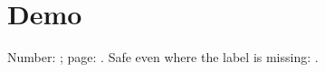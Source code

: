 \documentclass{article}
\begin{document}
\section{Demo}\label{demo}
Number: ; page: .
Safe even where the label is missing: .
\end{document}
